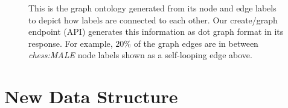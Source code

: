 \documentclass[preprint,3p,twocolumn]{elsarticle}
\begin{document}
\begin{figure}
\centering
    \caption{This is the graph ontology generated from its node and edge labels to depict how labels are connected to each other. Our create/graph endpoint (API) generates this information as dot graph format in its response. For example, $20\%$ of the graph edges are in between \textit{chess:MALE} node labels shown as a self-looping edge above.}
    \label{Figure:wikischema}
\end{figure}

\section{New Data Structure}
\label{Section:NewDataStructure}
\end{document}
